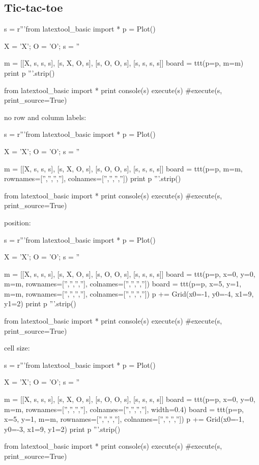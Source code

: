 \subsection{Tic-tac-toe}

\begin{python}
s = r'''from latextool_basic import *
p = Plot()

X = 'X'; O = 'O'; s = ''

m = [[X, s, s, s],
     [s, X, O, s],
     [s, O, O, s],
     [s, s, s, s]]
board = ttt(p=p, m=m)
print p
'''.strip()

from latextool_basic import *
print console(s)
execute(s)
#execute(s, print_source=True)
\end{python}

\newpage
no row and column labels:
\begin{python}
s = r'''from latextool_basic import *
p = Plot()

X = 'X'; O = 'O'; s = ''

m = [[X, s, s, s],
     [s, X, O, s],
     [s, O, O, s],
     [s, s, s, s]]
board = ttt(p=p, m=m,
            rownames=['','','',''], colnames=['','','',''])
print p
'''.strip()

from latextool_basic import *
print console(s)
execute(s)
#execute(s, print_source=True)
\end{python}

\newpage
position:
\begin{python}
s = r'''from latextool_basic import *
p = Plot()

X = 'X'; O = 'O'; s = ''

m = [[X, s, s, s],
     [s, X, O, s],
     [s, O, O, s],
     [s, s, s, s]]
board = ttt(p=p, x=0, y=0,
            m=m,
            rownames=['','','',''], colnames=['','','',''])
board = ttt(p=p, x=5, y=1,
            m=m,
            rownames=['','','',''], colnames=['','','',''])
p += Grid(x0=-1, y0=-4, x1=9, y1=2)
print p
'''.strip()

from latextool_basic import *
print console(s)
execute(s)
#execute(s, print_source=True)
\end{python}

\newpage
cell size:
\begin{python}
s = r'''from latextool_basic import *
p = Plot()

X = 'X'; O = 'O'; s = ''

m = [[X, s, s, s],
     [s, X, O, s],
     [s, O, O, s],
     [s, s, s, s]]
board = ttt(p=p, x=0, y=0,
            m=m,
            rownames=['','','',''], colnames=['','','',''],
            width=0.4)
board = ttt(p=p, x=5, y=1,
            m=m,
            rownames=['','','',''], colnames=['','','',''])
p += Grid(x0=-1, y0=-3, x1=9, y1=2)
print p
'''.strip()

from latextool_basic import *
print console(s)
execute(s)
#execute(s, print_source=True)
\end{python}




